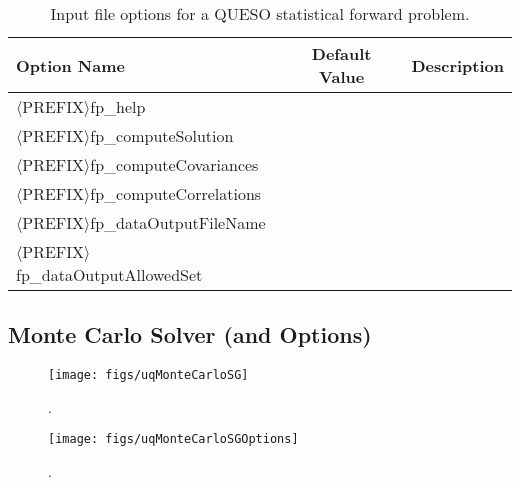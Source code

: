 \begin{table}[htpb]
\caption{Input file options for a QUESO statistical forward problem.}
\vspace{-8pt}
\ttfamily
\begin{center}
\begin{tabular}{l|c|c}
\toprule
 \rmfamily Option Name                     & \rmfamily Default Value& \rmfamily Description \\
\midrule
$\langle$PREFIX$\rangle$fp\_help                 &         &             \\
$\langle$PREFIX$\rangle$fp\_computeSolution      &         &             \\
$\langle$PREFIX$\rangle$fp\_computeCovariances   &         &             \\
$\langle$PREFIX$\rangle$fp\_computeCorrelations  &         &             \\
$\langle$PREFIX$\rangle$fp\_dataOutputFileName   &         &             \\
$\langle$PREFIX$\rangle$fp\_dataOutputAllowedSet &         &             \\
\bottomrule
\end{tabular}
\end{center}

\label{tab-sfp-options}
\end{table}

\subsection{Monte Carlo Solver (and Options)}

\begin{figure}[htpb]
\centering
\texttt{[image: figs/uqMonteCarloSG]}
\vspace*{-8pt}
\caption{{\color{red}{The Monte Carlo sequence generator class}}.}
\label{fig-monte-carlo-solver-class}
\end{figure}

\begin{figure}[htpb]
\centering
\texttt{[image: figs/uqMonteCarloSGOptions]}
\vspace*{-8pt}
\caption{{\color{red}{The Monte Carlo sequence generator options class}}.}
\label{fig-monte-carlo-options-class}
\end{figure}

